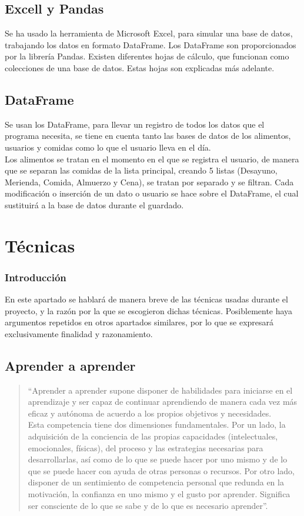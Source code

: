 \subsection{Excell y Pandas}
Se ha usado la herramienta de Microsoft Excel, para simular una base de datos, trabajando los datos en formato DataFrame. Los DataFrame son proporcionados por la librería Pandas. Existen diferentes hojas de cálculo, que funcionan como colecciones de una base de datos. Estas hojas son explicadas más adelante.
\subsection{DataFrame}
Se usan los DataFrame, para llevar un registro de todos los datos que el programa necesita, se tiene en cuenta tanto las bases de datos de los alimentos, usuarios y comidas como lo que el usuario lleva en el día.
\\
Los alimentos se tratan en el momento en el que se registra el usuario, de manera que se separan las comidas de la lista principal, creando 5 listas (Desayuno, Merienda, Comida, Almuerzo y Cena), se tratan por separado y se filtran. Cada modificación o inserción de un dato o usuario se hace sobre el DataFrame, el cual sustituirá a la base de datos durante el guardado.

\section{Técnicas}
\subsubsection{Introducción}
En este apartado se hablará de manera breve de las técnicas usadas durante el proyecto, y la razón por la que se escogieron dichas técnicas. Posiblemente haya argumentos repetidos en otros apartados similares, por lo que se expresará exclusivamente finalidad y razonamiento.
\subsection{Aprender a aprender}
\begin{quote}
“Aprender a aprender supone disponer de habilidades para iniciarse en el aprendizaje y ser capaz de continuar aprendiendo de manera cada vez más eficaz y autónoma de acuerdo a los propios objetivos y necesidades.\\

Esta competencia tiene dos dimensiones fundamentales. Por un lado, la adquisición de la conciencia de las propias capacidades (intelectuales, emocionales, físicas), del proceso y las estrategias necesarias para desarrollarlas, así como de lo que se puede hacer por uno mismo y de lo que se puede hacer con ayuda de otras personas o recursos. Por otro lado, disponer de un sentimiento de competencia personal que redunda en la motivación, la confianza en uno mismo y el gusto por aprender. Significa ser consciente de lo que se sabe y de lo que es necesario aprender”. \cite{aprenderAAprender}


\end{quote}

